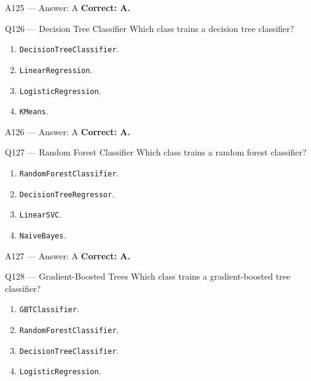 \documentclass[aspectratio=169,9pt]{beamer}
\begin{document}
	\begin{frame}{A125 --- Answer: A}
		\textbf{Correct: A.}
	\end{frame}
	
	\begin{frame}{Q126 --- Decision Tree Classifier}
		Which class trains a decision tree classifier?
		\begin{enumerate}[label=\Alph*.]
			\item \texttt{DecisionTreeClassifier}.
			\item \texttt{LinearRegression}.
			\item \texttt{LogisticRegression}.
			\item \texttt{KMeans}.
		\end{enumerate}
	\end{frame}
	
	\begin{frame}{A126 --- Answer: A}
		\textbf{Correct: A.}
	\end{frame}
	
	\begin{frame}{Q127 --- Random Forest Classifier}
		Which class trains a random forest classifier?
		\begin{enumerate}[label=\Alph*.]
			\item \texttt{RandomForestClassifier}.
			\item \texttt{DecisionTreeRegressor}.
			\item \texttt{LinearSVC}.
			\item \texttt{NaiveBayes}.
		\end{enumerate}
	\end{frame}
	
	\begin{frame}{A127 --- Answer: A}
		\textbf{Correct: A.}
	\end{frame}
	
	\begin{frame}{Q128 --- Gradient-Boosted Trees}
		Which class trains a gradient-boosted tree classifier?
		\begin{enumerate}[label=\Alph*.]
			\item \texttt{GBTClassifier}.
			\item \texttt{RandomForestClassifier}.
			\item \texttt{DecisionTreeClassifier}.
			\item \texttt{LogisticRegression}.
		\end{enumerate}
	\end{frame}
	
\end{document}
